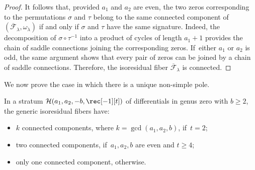 \begin{proof}
It follows that, provided $a_{1}$ and $a_{2}$ are even, the two zeros corresponding to the permutations $\sigma$ and $\tau$ belong to the same connected component of $(\overline{\mathcal{F}}_{\lambda}, \omega_\lambda)$ if and only if $\sigma$ and $\tau$ have the same signature. Indeed, the decomposition of $\sigma \circ \tau^{-1}$ into a product of cycles of length $a_{1}+1$ provides the chain of saddle connections joining the corresponding zeros. If~either $a_{1}$ or $a_{2}$ is odd, the same argument shows that every pair of zeros can be joined by a chain of saddle connections. Therefore, the isoresidual fiber $\overline{\mathcal{F}}_{\lambda}$ is connected.
\end{proof}

We now prove the case in which there is a unique non-simple pole.

\begin{lem}\label{lem:MAIN51big}
In a stratum $\mathcal{H}(a_{1},a_{2},-b,\rec[-1][t])$ of differentials in genus zero with $b\geq2$, the generic isoresidual fibers have:
\begin{itemize}
\item $k$ connected components, where $k=\gcd(a_{1},a_{2},b)$, if~$t=2$;
\item two connected components, if~$a_{1},a_{2},b$ are even and $t \geq 4$;
\item only one connected component, otherwise.
\end{itemize}
\end{lem}

